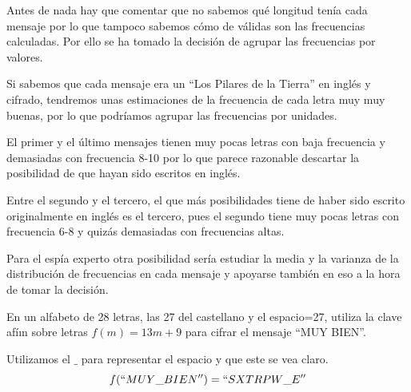 \begin{problem}[6]
	Antes de nada hay que comentar que no sabemos qué longitud tenía cada mensaje por lo que tampoco sabemos cómo de válidas son las frecuencias calculadas. Por ello se ha tomado la decisión de agrupar las frecuencias por valores.

	Si sabemos que cada mensaje era un ``Los Pilares de la Tierra'' en inglés y cifrado, tendremos unas estimaciones de la frecuencia de cada letra muy muy buenas, por lo que podríamos agrupar las frecuencias por unidades.

	El primer y el último mensajes tienen muy pocas letras con baja frecuencia y demasiadas con frecuencia 8-10 por lo que parece razonable descartar la posibilidad de que hayan sido escritos en inglés.

	Entre el segundo y el tercero, el que más posibilidades tiene de haber sido escrito originalmente en inglés es el tercero, pues el segundo tiene muy pocas letras con frecuencia 6-8 y quizás demasiadas con frecuencias altas.

	Para el espía experto otra posibilidad sería estudiar la media y la varianza de la distribución de frecuencias en cada mensaje y apoyarse también en eso a la hora de tomar la decisión.
\end{problem}


\begin{problem}[7]
	En un alfabeto de 28 letras, las 27 del castellano y el espacio=27, utiliza la clave afíın sobre letras $f(m) = 13m + 9$ para cifrar el mensaje ``MUY BIEN''.

	\solution


	Utilizamos el $\_$ para representar el espacio y que este se vea claro.
	\[f(``MUY\_BIEN'')=``SXTRPW\_E''\]
\end{problem}


